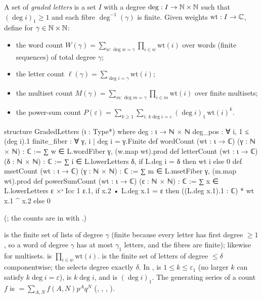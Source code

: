 \begin{definition}\label{ch19:def:letters}
A set of \emph{graded letters} is a set $I$ with a degree $\deg:I\to{\mathbb{N}}\times{\mathbb{N}}$ such that $(\deg i)_1\ge1$ and each fibre
$\deg^{-1}(\gamma)$ is finite.  Given weights $\mathrm{wt}:I\to{\mathbb{C}}$, define for $\gamma\in{\mathbb{N}}\times{\mathbb{N}}$:
\begin{itemize}
\item the word count $W(\gamma)=\sum_{w:\deg w=\gamma}\prod_{i\in w}\mathrm{wt}(i)$ over words (finite sequences) of total degree $\gamma$;
\item the letter count $\ell(\gamma)=\sum_{\deg i=\gamma}\mathrm{wt}(i)$;
\item the multiset count $M(\gamma)=\sum_{m:\deg m=\gamma}\prod_{i\in m}\mathrm{wt}(i)$ over finite multisets;
\item the power-sum count $P(\varepsilon)=\sum_{k\ge1}\sum_{i:\,k\deg i=\varepsilon}(\deg i)_1\,\mathrm{wt}(i)^k$.
\end{itemize}
\end{definition}
\begin{leancode}
structure GradedLetters (ι : Type*) where
  deg : ι → ℕ × ℕ
  deg_pos : ∀ i, 1 ≤ (deg i).1
  finite_fiber : ∀ γ, {i | deg i = γ}.Finite
def wordCount (wt : ι → ℂ) (γ : ℕ × ℕ) : ℂ := ∑ w ∈ L.wordFiber γ, (w.map wt).prod
def letterCount (wt : ι → ℂ) (δ : ℕ × ℕ) : ℂ :=
  ∑ i ∈ L.lowerLetters δ, if L.deg i = δ then wt i else 0
def msetCount (wt : ι → ℂ) (γ : ℕ × ℕ) : ℂ := ∑ m ∈ L.msetFiber γ, (m.map wt).prod
def powerSumCount (wt : ι → ℂ) (ε : ℕ × ℕ) : ℂ :=
  ∑ x ∈ L.lowerLetters ε ×ˢ Icc 1 ε.1,
    if x.2 • L.deg x.1 = ε then ((L.deg x.1).1 : ℂ) * wt x.1 ^ x.2 else 0
\end{leancode}
(; the counts are in  with
.)
\begin{dictionary}
 is the finite set of lists of degree $\gamma$ (finite because every letter has first degree $\ge1$,
so a word of degree $\gamma$ has at most $\gamma_1$ letters, and the fibres are finite);  likewise
for multisets.   is $\prod_{i\in w}\mathrm{wt}(i)$.   is the finite set of letters
of degree $\le\delta$ componentwise; the  selects degree exactly $\delta$.  In ,
 is $1\le k\le\varepsilon_1$ (no larger $k$ can satisfy $k\deg i=\varepsilon$),  is $k\deg i$,
and  is $(\deg i)_1$.  The generating series of a count $f$ is
 $=\sum_{A,N}f(A,N)p^Aq^N$ (, , ,
).
\end{dictionary}

